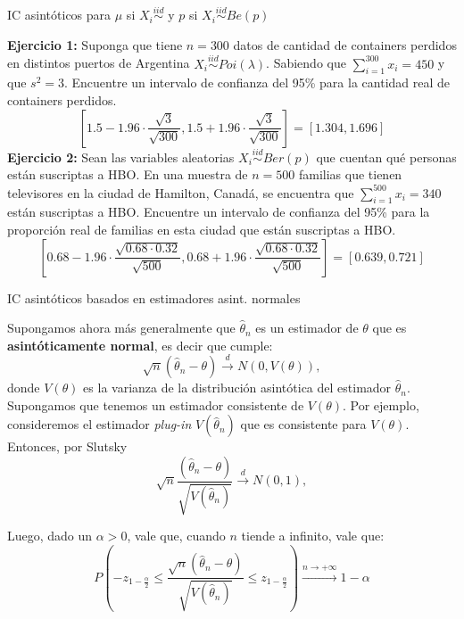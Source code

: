\documentclass{beamer}
\theoremstyle{definition}
\newcommand{\cw}{\overset{d}{\rightarrow}}
\begin{document}
\begin{frame}{\color{rosee}IC asint\'oticos para $\mu$ si $X_i\stackrel{iid}{\sim}$ y $p$ si $X_i\stackrel{iid}{\sim}Be(p)$} \small

\textbf{Ejercicio 1:} Suponga que tiene $n=300$ datos de cantidad de containers perdidos en distintos puertos de Argentina $X_i\stackrel{iid}{\sim}Poi(\lambda)$. Sabiendo que 
$\displaystyle\sum_{i=1}^{300} x_i=450$ y que $s^2=3$. Encuentre un intervalo de confianza del 95\% para
    la cantidad real de containers perdidos.\color{gray}\[\left[1.5-1.96\cdot \frac{\sqrt{3}}{\sqrt{300}},1.5+1.96\cdot \frac{\sqrt{3}}{\sqrt{300}}\right]=[1.304,1.696]\]\color{black}
\bigskip
  \textbf{Ejercicio 2:}
Sean las variables aleatorias $X_i\stackrel{iid}{\sim} Ber(p)$ que cuentan qué personas están suscriptas a HBO. En una muestra de $n=500$ familias que tienen televisores
    en la ciudad de Hamilton, Canad\'a, se encuentra que $\displaystyle\sum_{i=1}^{500} x_i=340$ est\'an
    suscriptas a HBO. Encuentre un intervalo de confianza del 95\% para
    la proporci\'on real de familias en esta ciudad que est\'an
    suscriptas a HBO.  \color{gray}\[\left[0.68-1.96\cdot \frac{\sqrt{0.68\cdot 0.32}}{\sqrt{500}},0.68+1.96\cdot \frac{\sqrt{0.68\cdot 0.32}}{\sqrt{500}}\right]=[0.639,0.721]\]\color{black}
\end{frame}




\begin{frame}{\color{rosee}IC asint\'oticos basados en estimadores asint. normales} \small
  
    Supongamos ahora más generalmente que $\widehat{\theta}_n$ es un estimador de $\theta$ que es \textbf{asintóticamente normal}, es decir que cumple:
$$
\sqrt{n}\left( \widehat{\theta}_n - \theta\right) \cw N\left(0,V(\theta)\right),
$$
donde $V(\theta)$ es la varianza de la distribución asintótica del estimador $\widehat{\theta}_n$. Supongamos que tenemos un estimador consistente de $V(\theta)$. Por ejemplo, consideremos el estimador \textit{plug-in} $V(\widehat{\theta}_n)$ que es consistente para $V(\theta)$. Entonces, por Slutsky 
$$
\sqrt{n}\frac{\left( \widehat{\theta}_n - \theta\right)}{\sqrt{V(\widehat{\theta}_n)}} \cw N\left(0,1\right),
$$

    Luego, dado un $\alpha > 0$, vale que, cuando $n$ tiende a infinito, vale que:
    \[P\left(-z_{1-\frac{\alpha}{2}} \leq
        \frac{\sqrt{n}(\widehat{\theta}_{n}-\theta)}{\sqrt{V(\widehat{\theta}_n)}} \leq 
        z_{1-\frac{\alpha}{2}}\right) \stackrel{n\to+\infty}{\longrightarrow} 1-\alpha\]


\end{frame}
\end{document}
